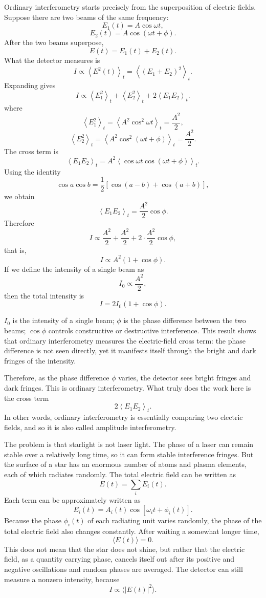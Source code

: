 Ordinary interferometry starts precisely from the superposition of electric fields. Suppose there are two beams of the same frequency:
\[
  E_1(t)=A\cos\omega t,
\]
\[
  E_2(t)=A\cos(\omega t+\phi).
\]
After the two beams superpose,
\[
  E(t)=E_1(t)+E_2(t).
\]
What the detector measures is
\[
  I\propto \left\langle E^2(t)\right\rangle_t
  =
  \left\langle \left(E_1+E_2\right)^2\right\rangle_t.
\]
Expanding gives
\[
  I
  \propto
  \left\langle E_1^2\right\rangle_t
  +
  \left\langle E_2^2\right\rangle_t
  +
  2\left\langle E_1E_2\right\rangle_t.
\]
where
\[
  \left\langle E_1^2\right\rangle_t
  =
  \left\langle A^2\cos^2\omega t\right\rangle_t
  =
  \frac{A^2}{2},
\]
\[
  \left\langle E_2^2\right\rangle_t
  =
  \left\langle A^2\cos^2(\omega t+\phi)\right\rangle_t
  =
  \frac{A^2}{2}.
\]
The cross term is
\[
  \left\langle E_1E_2\right\rangle_t
  =
  A^2\left\langle
  \cos\omega t\cos(\omega t+\phi)
  \right\rangle_t.
\]
Using the identity
\[
  \cos a\cos b
  =
  \frac{1}{2}\left[\cos(a-b)+\cos(a+b)\right],
\]
we obtain
\[
  \left\langle E_1E_2\right\rangle_t
  =
  \frac{A^2}{2}\cos\phi.
\]
Therefore
\[
  I
  \propto
  \frac{A^2}{2}
  +
  \frac{A^2}{2}
  +
  2\cdot \frac{A^2}{2}\cos\phi,
\]
that is,
\[
  I
  \propto
  A^2(1+\cos\phi).
\]
If we define the intensity of a single beam as
\[
  I_0\propto \frac{A^2}{2},
\]
then the total intensity is
\[
  I
  =
  2I_0(1+\cos\phi).
\]
\begin{formulaexplain}
\(I_0\) is the intensity of a single beam; \(\phi\) is the phase difference between the two beams; \(\cos\phi\) controls constructive or destructive interference. This result shows that ordinary interferometry measures the electric-field cross term: the phase difference is not seen directly, yet it manifests itself through the bright and dark fringes of the intensity.
\end{formulaexplain}
Therefore, as the phase difference \(\phi\) varies, the detector sees bright fringes and dark fringes. This is ordinary interferometry. What truly does the work here is the cross term
\[
  2\left\langle E_1E_2\right\rangle_t.
\]
In other words, ordinary interferometry is essentially comparing two electric fields, and so it is also called amplitude interferometry.

The problem is that starlight is not laser light. The phase of a laser can remain stable over a relatively long time, so it can form stable interference fringes. But the surface of a star has an enormous number of atoms and plasma elements, each of which radiates randomly. The total electric field can be written as
\[
  E(t)=\sum_i E_i(t).
\]
Each term can be approximately written as
\[
  E_i(t)=A_i(t)\cos[\omega_i t+\phi_i(t)].
\]
Because the phase \(\phi_i(t)\) of each radiating unit varies randomly, the phase of the total electric field also changes constantly. After waiting a somewhat longer time,
\[
  \langle E(t)\rangle=0.
\]
This does not mean that the star does not shine, but rather that the electric field, as a quantity carrying phase, cancels itself out after its positive and negative oscillations and random phases are averaged. The detector can still measure a nonzero intensity, because
\[
  I\propto \langle |E(t)|^2\rangle.
\]


